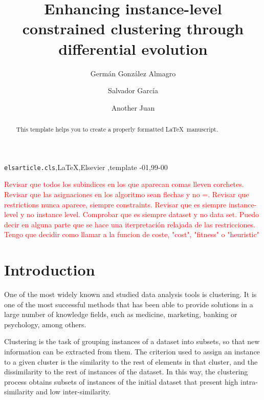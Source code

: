 \documentclass[review]{elsarticle}
\begin{document}
\begin{frontmatter}

\title{Enhancing instance-level constrained clustering through differential evolution}

\author[mymainaddress]{Germ\'an Gonz\'alez Almagro}

\author[mymainaddress]{Salvador Garc\'ia}

\author[mymainaddress]{Another Juan}

\address[mymainaddress]{Department of Computer Science and Artificial Intelligence, University of Granada, 18071 Granada, Spain}

\begin{abstract}
This template helps you to create a properly formatted \LaTeX\ manuscript.
\end{abstract}

\begin{keyword}
\texttt{elsarticle.cls}\sep \LaTeX\sep Elsevier \sep template
-01\sep  99-00
\end{keyword}

\end{frontmatter}

\linenumbers

\textcolor{red}{Revisar que todos los subindices en los que aparecan comas lleven corchetes. Revisar que las asignaciones en los algoritmo sean flechas y no =. Revisar que restrictions nunca aparece, siempre constraints. Revisar que es siempre instance-level y no instance level. Comprobar que es siempre dataset y no data set. Puedo decir en alguna parte que se hace una iterpretación relajada de las restricciones. Tengo que decidir como llamar a la funcion de coste, "cost", "fitness" o "heuristic"}

\section{Introduction}

One of the most widely known and studied data analysis tools is clustering. It is one of the most successful methods that has been able to provide solutions in a large number of knowledge fields, such as medicine, marketing, banking or psychology, among others.

Clustering is the task of grouping instances of a dataset into subsets, so that new information can be extracted from them. The criterion used to assign an instance to a given cluster is the similarity to the rest of elements in that cluster, and the dissimilarity to the rest of instances of the dataset. In this way, the clustering process obtains subsets of instances of the initial dataset that present high intra-similarity and low inter-similarity.
\end{document}
